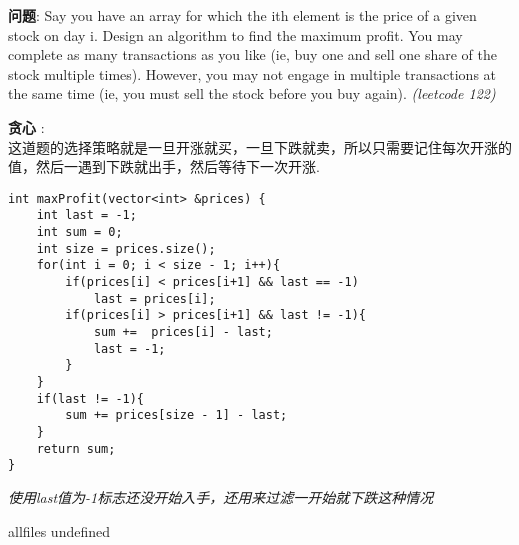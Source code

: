 \documentclass{article}
\begin{document}
\begin{CJK}{UTF8}{gbsn}     %

\else
    
\begin{description}
    \item{\textbf{问题}}: Say you have an array for which the ith element is the price of a given stock on day i. Design an algorithm to find the maximum profit. You may complete as many transactions as you like (ie, buy one and sell one share of the stock multiple times). However, you may not engage in multiple transactions at the same time (ie, you must sell the stock before you buy again). \textit{(leetcode 122)}
    \item{\textbf{贪心}} : 
    \\这道题的选择策略就是一旦开涨就买，一旦下跌就卖，所以只需要记住每次开涨的值，然后一遇到下跌就出手，然后等待下一次开涨.
    \begin{lstlisting}
int maxProfit(vector<int> &prices) {
	int last = -1;
	int sum = 0;
	int size = prices.size();
	for(int i = 0; i < size - 1; i++){
		if(prices[i] < prices[i+1] && last == -1)
			last = prices[i];
		if(prices[i] > prices[i+1] && last != -1){
			sum +=  prices[i] - last;
			last = -1;
		}
	}
	if(last != -1){
		sum += prices[size - 1] - last;
	}
	return sum;
}
    \end{lstlisting}
    \textit{使用last值为-1标志还没开始入手，还用来过滤一开始就下跌这种情况}
\end{description}

\fi

\ifx allfiles undefined
\end{CJK}
\end{document}

